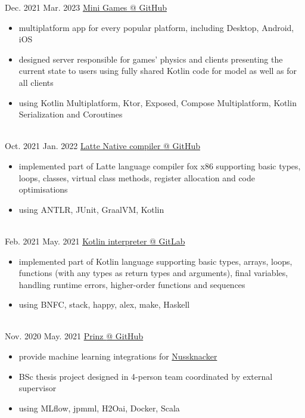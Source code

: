 \documentclass[a4paper]{twentysecondcv} %
\begin{document}
    \begin{twenty}
      \twentyitem
      {Dec. 2021}
      {Mar. 2023}
      {\href{https://github.com/avan1235/mini-games}{Mini Games {\footnotesize @ GitHub}}}
      {}
      {}
      {\begin{itemize}
         \item multiplatform app for every popular platform, including Desktop, Android, iOS
         \item designed server responsible for games' physics and clients presenting the current state to users using fully shared Kotlin code for model as well as for all clients
         \item using Kotlin Multiplatform, Ktor, Exposed, Compose Multiplatform, Kotlin Serialization and Coroutines
      \end{itemize}}
      \\
        \twentyitem
        {Oct. 2021}
        {Jan. 2022}
        {\href{https://github.com/avan1235/latte-compiler}{Latte Native compiler {\footnotesize @ GitHub}}}
        {}
        {}
        {\begin{itemize}
             \item implemented part of Latte language compiler fox x86 supporting basic types, loops, classes,
             virtual class methods, register allocation and code optimisations
             \item using ANTLR, JUnit, GraalVM, Kotlin
        \end{itemize}}
        \\
        \twentyitem
        {Feb. 2021}
        {May. 2021}
        {\href{https://gitlab.com/avan1235/kotlin-interpreter}{Kotlin interpreter {\footnotesize @ GitLab}}}
        {}
        {}
        {\begin{itemize}
             \item implemented part of Kotlin language supporting basic types, arrays, loops, functions
             (with any types as return types and arguments), final variables,
             handling runtime errors, higher-order functions and sequences
             \item using BNFC, stack, happy, alex, make, Haskell
        \end{itemize}}
        \\
        \twentyitem
        {Nov. 2020}
        {May. 2021}
        {\href{https://github.com/prinz-nussknacker/prinz}{Prinz {\footnotesize @ GitHub}}}
        {}
        {}
        {\begin{itemize}
             \item provide machine learning integrations for \href{https://github.com/TouK/nussknacker}{Nussknacker}
             \item BSc thesis project designed in 4-person team coordinated by external supervisor
             \item using MLflow, jpmml, H2Oai, Docker, Scala
        \end{itemize}}
        \\
    \end{twenty}
\end{document}
